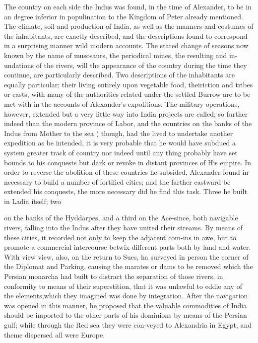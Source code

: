 \documentclass{article}
\begin{document}
The country on each side the Indus was found, in the time of Alexander, to be in an degree inferior in populination to the Kingdom of Peter already mentioned. The climate, soil and production of India, as well as the manners and costumes of the inhabitants, are exactly described, and the descriptions found to correspond in a surprising manner wild modern accounts. The stated change of seasons now known by the name of musosaurs, the periodical mines, the resulting and in-undations of the rivers, will the appearance of the country during the time they continue, are particularly described. Two descriptions of the inhabitants are equally particular; their living entirely upon vegetable food, theiriction and tribes or casts, with many of the authorities related under the settled Burrow are to be met with in the accounts of Alexander’s expolitions. The military operations, however, extended but a very little way into India projects are called; so further indeed than the modern province of Labor, and the countries on the banks of the Indus from Mother to the sea ( though, had the lived to undertake another expedition as be intended, it is very probable that he would have subdued a system greater track of country nor indeed until any thing probably have set bounds to his conquests but dark or revoke in distant provinces of His empire. In order to reverse the abolition of these countries he subsided, Alexander found in necessary to build a number of fortified cities; and the farther eastward be extended his conquests, the more necessary did he find this task. Three he built in Ladia itself; two

on the banks of the Hyddarpes, and a third on the Ace-since, both navigable rivers, falling into the Indus after they have united their streams. By means of these cities, it recorded not only to keep the adjacent com-ins in awe, but to promote a commercial intercourse betwix different parts both by land and water. With view view, also, on the return to Sues, ha surveyed in person the corner of the Diplomat and Parking, causing the marates or dams to be removed which the Persian monarcha had built to distract the separation of those rivers, in conformity to means of their superstition, that it was unlawful to eddie any of the elements,which they imagined was done by integration. After the navigation was opened in this manner, he proposed that the valuable commodities of India should be imported to the other parts of his dominions by means of the Persian gulf; while through the Red sea they were con-veyed to Alexandria in Egypt, and theme dispersed all were Europe.
\end{document}
